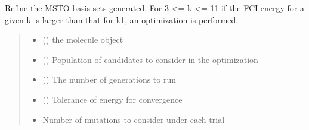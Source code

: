 \documentclass[letterpaper,10pt,english]{sphinxmanual}
\begin{document}
\begin{fulllineitems}
\label{\detokenize{api:MSTOOpt.LogicalRefinement}}
\pysigstartsignatures
\pysiglinewithargsret
{}
{\sphinxparamcomma {}\sphinxparamcomma {}\sphinxparamcomma {}\sphinxparamcomma {}\sphinxparamcomma {}\sphinxparamcomma {}\sphinxparamcomma {}}
{}
\pysigstopsignatures
\sphinxAtStartPar
Refine the MSTO basis sets generated. For 3 \textless{}= k \textless{}= 11 if the FCI energy for a given k is larger than that for k\sphinxhyphen{}1, an optimization is performed.
\begin{quote}\begin{description}
\begin{itemize}
\item {} 
\sphinxAtStartPar
{} () \textendash{} the  molecule object

\item {} 
\sphinxAtStartPar
{} () \textendash{} Population of candidates to consider in the optimization

\item {} 
\sphinxAtStartPar
{} () \textendash{} The number of generations to run

\item {} 
\sphinxAtStartPar
{} () \textendash{} Tolerance of energy for convergence

\item {} 
\sphinxAtStartPar
{} \textendash{} Number of mutations to consider under each trial


\end{itemize}
\end{description}
\end{quote}
\end{fulllineitems}
\end{document}
